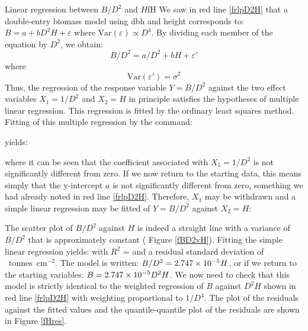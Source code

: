 \begin{filrouge}{Linear regression between $B/D^2$ and $H$}{fH}%
We saw in red line \ref{frlpD2H} that a double-entry biomass model using dbh and height corresponds to: $B=a+bD^2H+\varepsilon$ where $\mathrm{Var}(\varepsilon)\propto
D^4$. By dividing each member of the equation by $D^2$, we obtain:
\[
B/D^2=a/D^2+bH+\varepsilon'
\]
where
\[
\mathrm{Var}(\varepsilon')=\sigma^2
\]
Thus, the regression of the response variable $Y=B/D^2$ against the two effect variables $X_1=1/D^2$ and $X_2=H$ in principle satisfies the hypotheses of multiple linear regression. This regression is fitted by the ordinary least squares method. Fitting of this multiple regression by the command:

%
yields:

%
where it can be seen that the coefficient associated with $X_1=1/D^2$ is not significantly different from zero. If we now return to the starting data, this means simply that the y-intercept $a$ is not significantly different from zero, something we had already noted in red line \ref{frlpD2H}. Therefore, $X_1$ may be withdrawn and a simple linear regression may be fitted of $Y=B/D^2$ against $X_2=H$:

%
The scatter plot of $B/D^2$ against $H$ is indeed a straight line with a variance of $B/D^2$ that is approximately constant ( Figure \ref{fBD2vH}). Fitting the simple linear regression yields:
%
with $R^2$ =  and a residual standard deviation of ~tonnes~cm$^{-2}$. The model is written: $B/D^2=\mbox{2.747}\times10^{-5}H$, or if we return to the starting variables: $B=\mbox{2.747}\times10^{-5}D^2H$. We now need to check that this model is strictly identical to the weighted regression of $B$ against $D^2H$ shown in red line \ref{frlpD2H} with weighting proportional to $1/D^4$. The plot of the residuals against the fitted values and the quantile-quantile plot of the residuals are shown in  Figure \ref{fHres}.
\end{filrouge}

